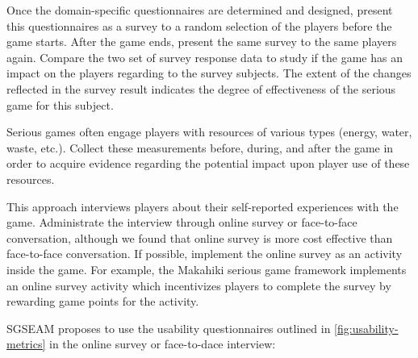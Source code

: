 Once the domain-specific questionnaires are determined and designed, present this questionnaires as a 
survey to a random selection of the players before the game starts. After the game ends, present the same 
survey to the same players again. Compare the two set of survey response data to study if the game has an 
impact on the players regarding to the survey subjects. The extent of the changes reflected in the survey 
result indicates the degree of effectiveness of the serious game for this subject.

Serious games often engage players with resources of various types (energy, water, waste, etc.). Collect 
these measurements before, during, and after the game in order to acquire evidence regarding the potential 
impact upon player use of these resources.

\label{Self-reported usability metrics}

This approach interviews players about their self-reported experiences with the game. Administrate the 
interview through online survey or face-to-face conversation, although we found that online survey is more 
cost effective than face-to-face conversation. If possible, implement the online survey as an activity inside the 
game. For example, the Makahiki serious game framework implements an online survey activity which 
incentivizes players to complete the survey by rewarding game points for the activity.

SGSEAM proposes to use the usability questionnaires outlined in \autoref{fig:usability-metrics} in the online survey or face-to-dace interview:\\

